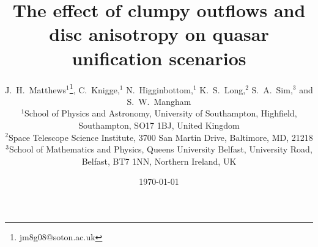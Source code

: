 \documentclass[useAMS,usenatbib]{mn2e_x}
\begin{document}


\def\py{\textsc{Python}}
\def\tar{\textsc{Tardis}}
\def\cld{\textsc{Cloudy}}
\def\agn{\textsc{Agnspec}}


\def\civ{C~\textsc{iv}}
\def\nv{N~\textsc{v}}
\def\heii{He~\textsc{ii}}
\def\ovi{O~\textsc{vi}}
\def\la{Ly$\alpha$}
\def\ha{H$\alpha$}

\def\araa{ARAA}
\def\nat{Nature}
\def\apjl{ApJ Letters}
\def\aapr{AAPR}
\def\ssr{SSR}
\def\apj{ApJ}
\def\pasp{PASP}
\def\aap{A\&A}
\def\mnras{MNRAS}
\def\aj{AJ}
\def\rmxaa{RMXAA}

%
%

\title
{
The effect of clumpy outflows
and disc anisotropy on quasar unification scenarios
}



\author[Matthews et al.]{J.~H.~Matthews$^1$\thanks{jm8g08@soton.ac.uk}, C.~Knigge,$^1$
N.~Higginbottom,$^1$ K.~S.~Long,$^2$ S.~A.~Sim,$^3$ and S.~W.~Mangham
\medskip  
\\$^1$School of Physics and Astronomy, University of Southampton, Highfield, Southampton, SO17 1BJ, United Kingdom
\\$^2$Space Telescope Science Institute, 3700 San Martin Drive, Baltimore, MD, 21218
\\$^3$School of Mathematics and Physics, Queens University Belfast, University Road, Belfast, BT7 1NN, Northern Ireland, UK}

\date{\today}


%
%

\maketitle
\end{document}
